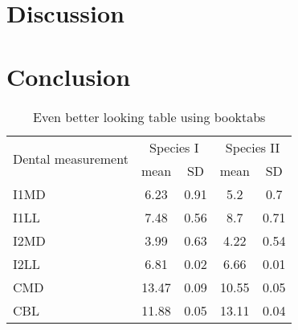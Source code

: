 \section{Discussion}

\section{Conclusion}


\begin{table}
\caption{Even better looking table using booktabs}
\centering
\label{table:good_table}
\begin{tabular}{l c c c c}
\toprule
\multirow{2}{*}{Dental measurement} & \multicolumn{2}{c}{Species I} & \multicolumn{2}{c}{Species II} \\ 
\cmidrule{2-5}
  & mean & SD  & mean & SD  \\ 
\midrule
I1MD & 6.23 & 0.91 & 5.2  & 0.7  \\

I1LL & 7.48 & 0.56 & 8.7  & 0.71 \\

I2MD & 3.99 & 0.63 & 4.22 & 0.54 \\

I2LL & 6.81 & 0.02 & 6.66 & 0.01 \\

CMD & 13.47 & 0.09 & 10.55 & 0.05 \\

CBL & 11.88 & 0.05 & 13.11 & 0.04\\ 
\bottomrule
\end{tabular}
\end{table}
